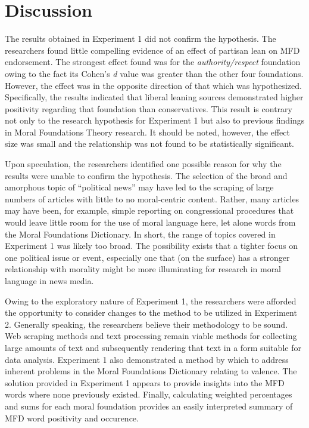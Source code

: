 \documentclass[,man]{apa6}
\begin{document}
\section{Discussion}\label{discussion}

The results obtained in Experiment 1 did not confirm the hypothesis. The
researchers found little compelling evidence of an effect of partisan
lean on MFD endorsement. The strongest effect found was for the
\emph{authority/respect} foundation owing to the fact its Cohen's
\emph{d} value was greater than the other four foundations. However, the
effect was in the opposite direction of that which was hypothesized.
Specifically, the results indicated that liberal leaning sources
demonstrated higher positivity regarding that foundation than
conservatives. This result is contrary not only to the research
hypothesis for Experiment 1 but also to previous findings in Moral
Foundations Theory research. It should be noted, however, the effect
size was small and the relationship was not found to be statistically
significant.

Upon speculation, the researchers identified one possible reason for why
the results were unable to confirm the hypothesis. The selection of the
broad and amorphous topic of \enquote{political news} may have led to
the scraping of large numbers of articles with little to no
moral-centric content. Rather, many articles may have been, for example,
simple reporting on congressional procedures that would leave little
room for the use of moral language here, let alone words from the Moral
Foundations Dictionary. In short, the range of topics covered in
Experiment 1 was likely too broad. The possibility exists that a tighter
focus on one political issue or event, especially one that (on the
surface) has a stronger relationship with morality might be more
illuminating for research in moral language in news media.

Owing to the exploratory nature of Experiment 1, the researchers were
afforded the opportunity to consider changes to the method to be
utilized in Experiment 2. Generally speaking, the researchers believe
their methodology to be sound. Web scraping methods and text processing
remain viable methods for collecting large amounts of text and
subsequently rendering that text in a form suitable for data analysis.
Experiment 1 also demonstrated a method by which to address inherent
problems in the Moral Foundations Dictionary relating to valence. The
solution provided in Experiment 1 appears to provide insights into the
MFD words where none previously existed. Finally, calculating weighted
percentages and sums for each moral foundation provides an easily
interpreted summary of MFD word positivity and occurence.
\end{document}
